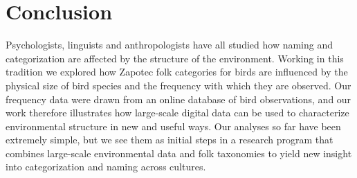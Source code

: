 \documentclass[10pt,letterpaper]{article}
\begin{document}
\section{Conclusion}

Psychologists, linguists and anthropologists have all studied how naming and categorization are affected by the structure of the environment.  Working in this tradition we explored how Zapotec folk categories for birds are influenced by the physical size of bird species and the frequency with which they are observed. Our frequency data were drawn from an online database of bird observations, and our work therefore illustrates how large-scale digital data can be used to characterize environmental structure in new and useful ways. Our analyses so far have been extremely simple, but we see them as initial steps in a research program that combines large-scale environmental data and folk taxonomies to yield new insight into categorization and naming across cultures. 






\end{document}

